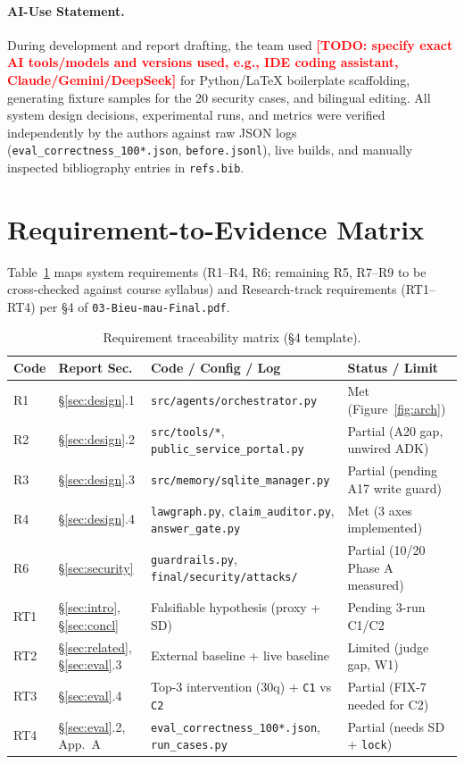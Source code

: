 \documentclass[sigconf,nonacm]{acmart}
\newcommand{\TODO}[1]{\textcolor{red}{\textbf{[TODO: #1]}}}
\begin{document}
\paragraph{AI-Use Statement.}
During development and report drafting, the team used \TODO{specify exact AI tools/models and versions used, e.g., IDE coding assistant, Claude/Gemini/DeepSeek} for Python/LaTeX boilerplate scaffolding, generating fixture samples for the 20 security cases, and bilingual editing. All system design decisions, experimental runs, and metrics were verified independently by the authors against raw JSON logs (\texttt{eval\_correctness\_100*.json}, \texttt{before.jsonl}), live builds, and manually inspected bibliography entries in \texttt{refs.bib}.

\section{Requirement-to-Evidence Matrix}
\label{app:matrix}

Table~\ref{tab:req} maps system requirements (R1--R4, R6; remaining R5, R7--R9 to be cross-checked against course syllabus) and Research-track requirements (RT1--RT4) per §4 of \texttt{03-Bieu-mau-Final.pdf}.

\begin{table}[H]
\caption{Requirement traceability matrix (§4 template).}
\label{tab:req}
\scriptsize
\begin{tabular}{@{}p{1.0cm}p{1.6cm}p{2.7cm}p{2.1cm}@{}}
\toprule
\textbf{Code} & \textbf{Report Sec.} & \textbf{Code / Config / Log} & \textbf{Status / Limit} \\
\midrule
R1 & §\ref{sec:design}.1 & \texttt{src/agents/orchestrator.py} & Met (Figure~\ref{fig:arch}) \\
R2 & §\ref{sec:design}.2 & \texttt{src/tools/*}, \texttt{public\_service\_portal.py} & Partial (A20 gap, unwired ADK) \\
R3 & §\ref{sec:design}.3 & \texttt{src/memory/sqlite\_manager.py} & Partial (pending A17 write guard) \\
R4 & §\ref{sec:design}.4 & \texttt{lawgraph.py}, \texttt{claim\_auditor.py}, \texttt{answer\_gate.py} & Met (3 axes implemented) \\
R6 & §\ref{sec:security} & \texttt{guardrails.py}, \texttt{final/security/attacks/} & Partial (10/20 Phase A measured) \\
\midrule
RT1 & §\ref{sec:intro}, §\ref{sec:concl} & Falsifiable hypothesis (proxy + SD) & Pending 3-run C1/C2 \\
RT2 & §\ref{sec:related}, §\ref{sec:eval}.3 & External baseline \cite{phan2026sbv} + live baseline & Limited (judge gap, W1) \\
RT3 & §\ref{sec:eval}.4 & Top-3 intervention (30q) + \texttt{C1} vs \texttt{C2} & Partial (FIX-7 needed for C2) \\
RT4 & §\ref{sec:eval}.2, App.~A & \texttt{eval\_correctness\_100*.json}, \texttt{run\_cases.py} & Partial (needs SD + \texttt{lock}) \\
\bottomrule
\end{tabular}
\end{table}
\end{document}
